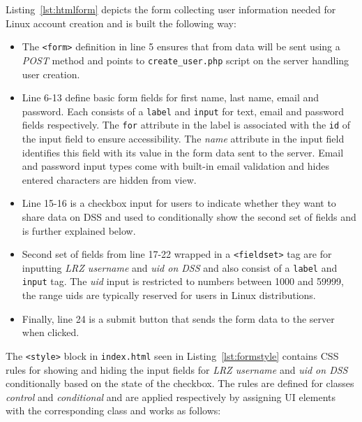 Listing~\ref{lst:htmlform} depicts the form collecting user information needed
for Linux account creation and is built the following way:

\begin{itemize}
    \item The \texttt{<form>} definition in line 5 ensures that from data will
    be sent using a \textit{POST} method and points to \texttt{create\_user.php}
    script on the server handling user creation.
    \item Line 6-13 define basic form fields for first name, last name, email
    and password. Each consists of a \texttt{label} and \texttt{input} for text,
    email and password fields respectively. The \texttt{for} attribute in the
    label is associated with the \texttt{id} of the input field to ensure
    accessibility. The \textit{name} attribute in the input field identifies
    this field with its value in the form data sent to the server. Email and
    password input types come with built-in email validation and hides entered
    characters are hidden from view.
    \item Line 15-16 is a checkbox input for users to indicate whether they want
    to share data on DSS and used to conditionally show the second set of
    fields and is further explained below.
    \item Second set of fields from line 17-22 wrapped in a \texttt{<fieldset>}
    tag are for inputting \textit{LRZ username} and \textit{uid on DSS} and also
    consist of a \texttt{label} and \texttt{input} tag. The \textit{uid} input
    is restricted to numbers between 1000 and 59999, the range uids are
    typically reserved for users in Linux distributions.
    \item Finally, line 24 is a submit button that sends the form data to the
    server when clicked.
\end{itemize}



The \texttt{<style>} block in \texttt{index.html} seen in
Listing~\ref{lst:formstyle} contains CSS rules for showing and hiding the input
fields for \textit{LRZ username} and \textit{uid on DSS} conditionally based on
the state of the checkbox. The rules are defined for classes \textit{control}
and \textit{conditional} and are applied respectively by assigning UI elements
with the corresponding class and works as follows:

